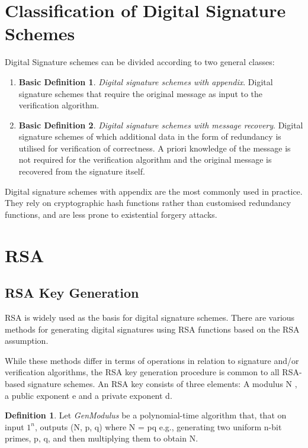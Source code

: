\documentclass[]{final_report}
\theoremstyle{definition}
\newtheorem{definition}{Definition}[chapter]
\newtheorem{basic}{Basic Definition}
\begin{document}
\section{Classification of Digital Signature Schemes}
Digital Signature schemes can be divided according to two general classes:
\begin{enumerate}
    \item \begin{basic} 
\textit{Digital signature schemes with appendix}. Digital signature schemes that require the original message as input to the verification algorithm.
\end{basic}
    \item \begin{basic}
\textit{Digital signature schemes with message recovery}. Digital signature schemes of which additional data in the form of redundancy is utilised for verification of correctness. A priori knowledge of the message is not required for the verification algorithm and the original message is recovered from the signature itself.
\end{basic}

\end{enumerate}

Digital signature schemes with appendix are the most commonly used in practice. They rely on cryptographic hash functions rather than customised redundancy functions, and are less prone to existential forgery attacks.


\section{RSA}
\subsection{RSA Key Generation}
\label{subSec:keygen}
RSA is widely used as the basis for digital signature schemes. There are various methods for generating digital signatures using RSA functions based on the RSA assumption. 


While these methods differ in terms of operations in relation to signature and/or verification algorithms, the RSA key generation procedure is common to all RSA-based signature schemes.  An RSA key consists of three elements: A modulus N , a public exponent e and a private exponent d.

\begin{definition}
Let \textit{GenModulus} be a polynomial-time algorithm that, that on input $1^n$, outputs (N, p, q) where N = pq e.g.,  generating two uniform n-bit primes,  p, q, and then multiplying them to obtain N.
\end{definition}
\end{document}
